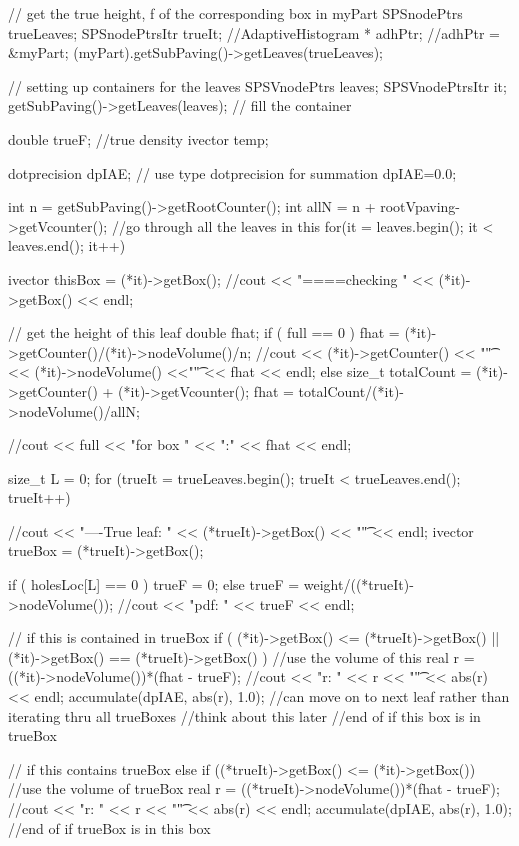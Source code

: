 \begin{DoxyCode}
{
   // get the true height, f of the corresponding box in myPart
  SPSnodePtrs trueLeaves;
  SPSnodePtrsItr trueIt;
  //AdaptiveHistogram * adhPtr;
  //adhPtr = &myPart;
  (myPart).getSubPaving()->getLeaves(trueLeaves);

  // setting up containers for the leaves
  SPSVnodePtrs leaves;
  SPSVnodePtrsItr it;
  getSubPaving()->getLeaves(leaves); // fill the container

  double trueF; //true density
  ivector temp;
  
  dotprecision dpIAE;    // use type dotprecision for summation  
  dpIAE=0.0;

  int n = getSubPaving()->getRootCounter();
  int allN = n + rootVpaving->getVcounter();
  //go through all the leaves in this
  for(it = leaves.begin(); it < leaves.end(); it++) {
    ivector thisBox = (*it)->getBox();
    //cout << "====checking " << (*it)->getBox() << endl;
      
    // get the height of this leaf
    double fhat;
    if ( full == 0 ) { 
      fhat = (*it)->getCounter()/(*it)->nodeVolume()/n;
      //cout << (*it)->getCounter() << "\t" << (*it)->nodeVolume() <<"\t" <<
       fhat << endl;
    }
    else {
      size_t totalCount = (*it)->getCounter() + (*it)->getVcounter();
      fhat = totalCount/(*it)->nodeVolume()/allN;
    }

    //cout << full << "\tfhat for box " << ":" << fhat << endl;

    size_t L = 0;
    for (trueIt = trueLeaves.begin(); trueIt < trueLeaves.end(); trueIt++) {
      //cout << "----True leaf: " << (*trueIt)->getBox() << "\t" << endl;
      ivector trueBox = (*trueIt)->getBox();

      if (  holesLoc[L] == 0 ) { trueF = 0; }
      else { trueF = weight/((*trueIt)->nodeVolume()); }
      //cout << "pdf: " << trueF  << endl;
      
      // if this is contained in trueBox
      if ( (*it)->getBox() <= (*trueIt)->getBox() || (*it)->getBox() == 
      (*trueIt)->getBox() ) {
        //use the volume of this
        real r = ((*it)->nodeVolume())*(fhat - trueF);
        //cout << "r: " << r << "\t" << abs(r) << endl;
        accumulate(dpIAE, abs(r), 1.0);
        //can move on to next leaf rather than iterating thru all trueBoxes
        //think about this later
      } //end of if this box is in trueBox
      
      // if this contains trueBox
      else if ((*trueIt)->getBox() <= (*it)->getBox()) {
        //use the volume of trueBox
        real r = ((*trueIt)->nodeVolume())*(fhat - trueF);
        //cout << "r: " << r << "\t" << abs(r) << endl;
        accumulate(dpIAE, abs(r), 1.0);
      } //end of if trueBox is in this box
      
}}}
\end{DoxyCode}
